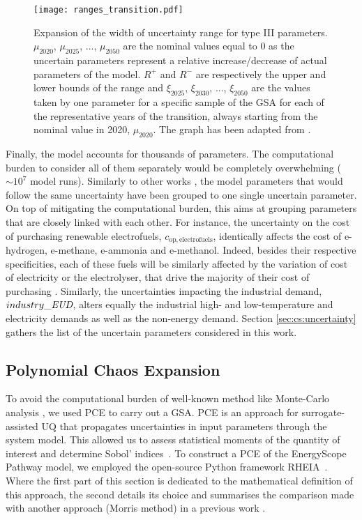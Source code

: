 \begin{figure}[htbp!]
\centering
\texttt{[image: ranges\_transition.pdf]}
\caption{Expansion of the width of uncertainty range for type III parameters. $\mu_{2020}$, $\mu_{2025}$, ...,  $\mu_{2050}$ are the nominal values equal to 0 as the uncertain parameters represent a relative increase/decrease of actual parameters of the model. $R^+$ and $R^-$ are respectively the upper and lower bounds of the range and $\xi_{2025}$, $\xi_{2030}$, ...,  $\xi_{2050}$ are the values taken by one parameter for a specific sample of the \gls{GSA} for each of the representative years of the transition, always starting from the nominal value in 2020, $\mu_{2020}$. The graph has been adapted from \cite{guevara2022modeling}.}
\label{fig:ranges_transition}
\end{figure}

\newpage
Finally, the model accounts for thousands of parameters. The computational burden to consider all of them separately would be completely overwhelming ($\sim 10^7$ model runs). Similarly to other works \cite{Moret2017,limpens2020impact}, the model parameters that would follow the same uncertainty have been grouped to one single uncertain parameter. On top of mitigating the computational burden, this aims at grouping parameters that are closely linked with each other. For instance, the uncertainty on the cost of purchasing renewable electrofuels, $c_{\mathrm{op,electrofuels}}$, identically affects the cost of e-hydrogen, e-methane, e-ammonia and e-methanol. Indeed, besides their respective specificities, each of these fuels will be similarly affected by the variation of cost of electricity or the electrolyser, that drive the majority of their cost of purchasing \cite{h2coalition}. Similarly, the uncertainties impacting the industrial demand, $industry\_\emph{EUD}$, alters equally the industrial high- and low-temperature and electricity demands as well as the non-energy demand. Section \ref{sec:cs:uncertainty} gathers the list of the uncertain parameters considered in this work.

\subsection{Polynomial Chaos Expansion}
\label{subsec:pce}

To avoid the computational burden of well-known method like Monte-Carlo analysis \cite{yue2018review}, we used \gls{PCE} to carry out a \gls{GSA}. \gls{PCE} is an approach for surrogate-assisted \gls{UQ} that propagates uncertainties in input parameters through the system model. This allowed us to assess statistical moments of the quantity of interest and determine Sobol' indices~\cite{coppitters2020robust}. To construct a PCE of the EnergyScope Pathway model, we employed the open-source Python framework RHEIA~\cite{coppitters2022rheia,readthedocs_rheia}. Where the first part of this section is dedicated to the mathematical definition of this approach, the second details its choice and summarises the comparison made with another approach (\ie Morris method) in a previous work \cite{limpens2020impact}.\\

